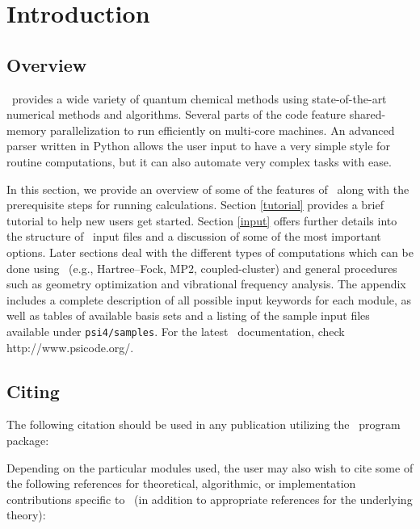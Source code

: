 \section{Introduction} \label{introduction}

\subsection{Overview} 

\PSIfour\ provides a wide variety of quantum chemical methods using
state-of-the-art numerical methods and algorithms.  Several parts of
the code feature shared-memory parallelization to run efficiently on
multi-core machines.  An advanced parser written in Python allows the user
input to have a very simple style for routine computations, but it can also
automate very complex tasks with ease. 

In this section, we provide an overview of
some of the features of \PSIfour\ along with the prerequisite steps for
running calculations.  Section \ref{tutorial} provides a brief tutorial to
help new users get started.  Section \ref{input} offers further details
into the structure of \PSIfour\ input files and a discussion of some of
the most important options.  Later sections deal with the different types
of computations which can be done using \PSIfour\ (e.g., Hartree--Fock,
MP2, coupled-cluster) and general procedures such as geometry optimization
and vibrational frequency analysis.  The appendix includes a complete
description of all possible input keywords for each module,
as well as tables of available basis sets and a listing of the sample input
files available under {\tt psi4/samples}.
For the latest \PSIfour\ documentation, check  {http://www.psicode.org/}.

\subsection{Citing \PSIfour}

The following citation should be used in any publication utilizing the
\PSIfour\ program package:

\begin{quotation}
\noindent

\end{quotation}

Depending on the particular modules used, the user may also wish to
cite some of the following references for theoretical, algorithmic,
or implementation contributions specific to \PSIfour\ (in addition to
appropriate references for the underlying theory):

